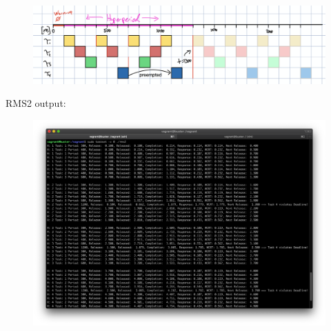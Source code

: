 \begin{enumerate}[label=\textbf{\arabic*})]
\begin{figure}[H]
        \includegraphics[width=\linewidth]{4-1-rms2-schedule}
\end{figure}
RMS2 output:
\begin{figure}[H]
        \includegraphics[width=\linewidth]{4-rms2-output}
\end{figure}
\end{enumerate}
